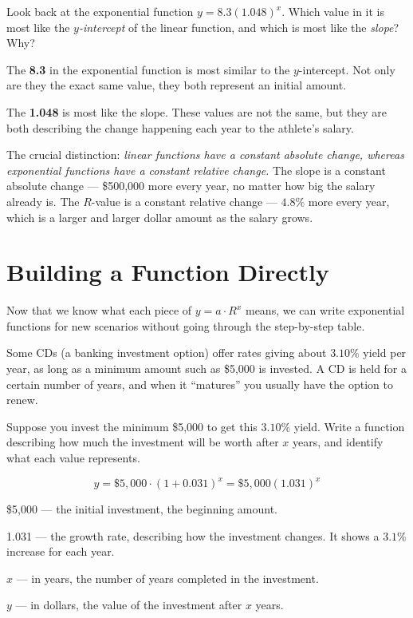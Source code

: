 \documentclass[12pt]{ximera}
\begin{document}
\begin{problem}
Look back at the exponential function $y = 8.3(1.048)^x$. Which value in it is most like
the \emph{$y$-intercept} of the linear function, and which is most like the \emph{slope}?
Why?

\begin{freeResponse}
\end{freeResponse}

\begin{solution}
The \textbf{8.3} in the exponential function is most similar to the $y$-intercept. Not
only are they the exact same value, they both represent an initial amount.

The \textbf{1.048} is most like the slope. These values are not the same, but they are
both describing the change happening each year to the athlete's salary.

The crucial distinction: \emph{linear functions have a constant absolute change, whereas
exponential functions have a constant relative change.} The slope is a constant absolute
change --- \$500,000 more every year, no matter how big the salary already is. The
$R$-value is a constant relative change --- $4.8\%$ more every year, which is a larger
and larger dollar amount as the salary grows.
\end{solution}
\end{problem}

\section*{Building a Function Directly}

Now that we know what each piece of $y = a \cdot R^x$ means, we can write exponential
functions for new scenarios without going through the step-by-step table.

Some CDs (a banking investment option) offer rates giving about $3.10\%$ yield per year,
as long as a minimum amount such as \$5,000 is invested. A CD is held for a certain number
of years, and when it ``matures'' you usually have the option to renew.

\begin{problem}
Suppose you invest the minimum \$5,000 to get this $3.10\%$ yield. Write a function
describing how much the investment will be worth after $x$ years, and identify what each
value represents.

\begin{freeResponse}
\end{freeResponse}

\begin{solution}
\[
y = \$5{,}000 \cdot (1 + 0.031)^x = \$5{,}000(1.031)^x
\]

\$5,000 --- the initial investment, the beginning amount.

1.031 --- the growth rate, describing how the investment changes. It shows a $3.1\%$
increase for each year.

$x$ --- in years, the number of years completed in the investment.

$y$ --- in dollars, the value of the investment after $x$ years.
\end{solution}
\end{problem}
\end{document}
